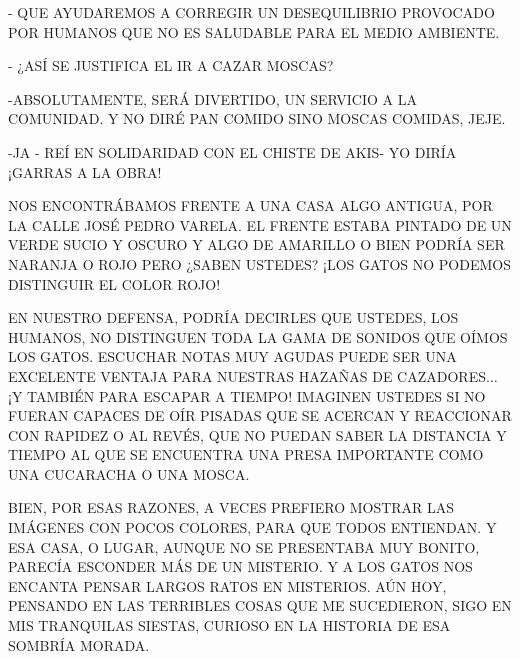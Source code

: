 - QUE AYUDAREMOS A CORREGIR UN DESEQUILIBRIO PROVOCADO POR HUMANOS QUE NO ES SALUDABLE PARA EL MEDIO AMBIENTE. 

- ¿ASÍ SE JUSTIFICA EL IR A CAZAR MOSCAS?

-ABSOLUTAMENTE, SERÁ DIVERTIDO, UN SERVICIO A LA COMUNIDAD. Y NO DIRÉ PAN COMIDO SINO MOSCAS COMIDAS, JEJE.

-JA - REÍ EN SOLIDARIDAD CON EL CHISTE DE AKIS- YO DIRÍA ¡GARRAS A LA OBRA!




\newpage
{}
\newpage
{}

NOS ENCONTRÁBAMOS FRENTE A UNA CASA ALGO ANTIGUA, POR LA CALLE JOSÉ PEDRO VARELA. EL FRENTE ESTABA PINTADO DE UN VERDE SUCIO Y OSCURO Y ALGO DE AMARILLO O BIEN PODRÍA SER NARANJA O ROJO PERO ¿SABEN USTEDES? ¡LOS GATOS NO PODEMOS DISTINGUIR EL COLOR ROJO!

EN NUESTRO DEFENSA, PODRÍA DECIRLES QUE USTEDES, LOS HUMANOS, NO DISTINGUEN TODA LA GAMA DE SONIDOS QUE OÍMOS LOS GATOS. ESCUCHAR  NOTAS MUY AGUDAS PUEDE SER UNA EXCELENTE VENTAJA PARA NUESTRAS HAZAÑAS DE CAZADORES$\ldots$ ¡Y TAMBIÉN PARA ESCAPAR A TIEMPO! IMAGINEN USTEDES SI NO FUERAN CAPACES DE OÍR PISADAS QUE SE ACERCAN Y REACCIONAR CON RAPIDEZ O AL REVÉS, QUE NO PUEDAN SABER LA DISTANCIA Y TIEMPO AL QUE SE ENCUENTRA UNA PRESA IMPORTANTE COMO UNA CUCARACHA O UNA MOSCA. 



\newpage
{}

BIEN, POR ESAS RAZONES, A VECES PREFIERO MOSTRAR LAS IMÁGENES CON POCOS COLORES, PARA QUE TODOS ENTIENDAN. Y ESA CASA, O LUGAR, AUNQUE NO SE PRESENTABA MUY BONITO, PARECÍA ESCONDER MÁS DE UN MISTERIO. Y A LOS GATOS NOS ENCANTA PENSAR LARGOS RATOS EN MISTERIOS. AÚN HOY, PENSANDO EN LAS TERRIBLES COSAS QUE ME SUCEDIERON, SIGO EN MIS TRANQUILAS SIESTAS,  CURIOSO EN LA HISTORIA DE ESA SOMBRÍA MORADA.

